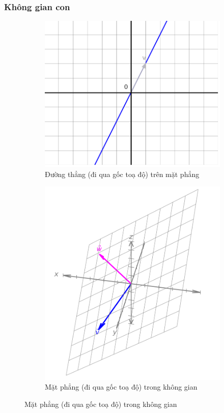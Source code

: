 \subsubsection*{Không gian con}
\begin{figure}[H]
    \centering
    \begin{subfigure}[t]{0.4\textwidth}
        \centering
        \includegraphics[width=0.8\linewidth]{Tuan2/Figures/lineonplane.png}
        \caption{Đường thẳng (đi qua gốc toạ độ) trên mặt phẳng}
    \end{subfigure}
    \hfill
    \begin{subfigure}[t]{0.4\textwidth}
        \centering
        \includegraphics[width=0.8\linewidth]{Tuan2/Figures/planeinspace.png}
        \caption{Mặt phẳng (đi qua gốc toạ độ) trong không gian}
    \end{subfigure}
\end{figure}
